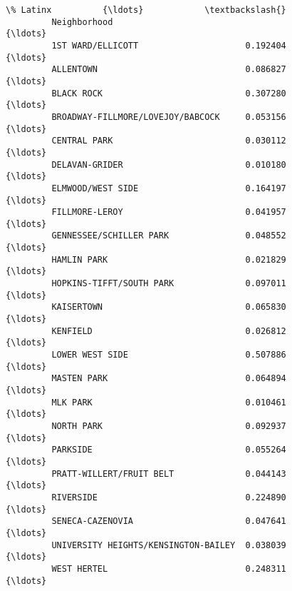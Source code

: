 \documentclass[11pt]{article}
\begin{document}
\begin{Verbatim}[commandchars=\\\{\}]
                                               \% Latinx          {\ldots}            \textbackslash{}
         Neighborhood                                            {\ldots}             
         1ST WARD/ELLICOTT                     0.192404          {\ldots}             
         ALLENTOWN                             0.086827          {\ldots}             
         BLACK ROCK                            0.307280          {\ldots}             
         BROADWAY-FILLMORE/LOVEJOY/BABCOCK     0.053156          {\ldots}             
         CENTRAL PARK                          0.030112          {\ldots}             
         DELAVAN-GRIDER                        0.010180          {\ldots}             
         ELMWOOD/WEST SIDE                     0.164197          {\ldots}             
         FILLMORE-LEROY                        0.041957          {\ldots}             
         GENNESSEE/SCHILLER PARK               0.048552          {\ldots}             
         HAMLIN PARK                           0.021829          {\ldots}             
         HOPKINS-TIFFT/SOUTH PARK              0.097011          {\ldots}             
         KAISERTOWN                            0.065830          {\ldots}             
         KENFIELD                              0.026812          {\ldots}             
         LOWER WEST SIDE                       0.507886          {\ldots}             
         MASTEN PARK                           0.064894          {\ldots}             
         MLK PARK                              0.010461          {\ldots}             
         NORTH PARK                            0.092937          {\ldots}             
         PARKSIDE                              0.055264          {\ldots}             
         PRATT-WILLERT/FRUIT BELT              0.044143          {\ldots}             
         RIVERSIDE                             0.224890          {\ldots}             
         SENECA-CAZENOVIA                      0.047641          {\ldots}             
         UNIVERSITY HEIGHTS/KENSINGTON-BAILEY  0.038039          {\ldots}             
         WEST HERTEL                           0.248311          {\ldots}             
         

\end{Verbatim}
\end{document}
